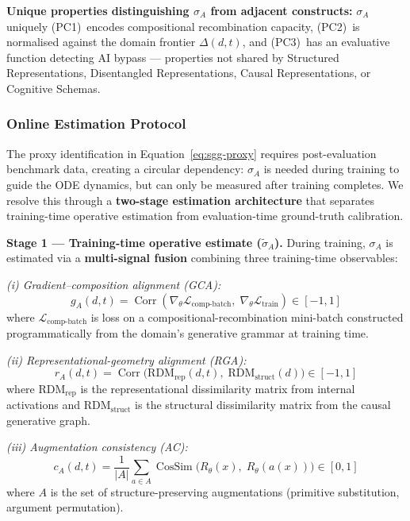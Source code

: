 \documentclass[11pt,a4paper]{article}
\DeclareMathOperator{\Corr}{Corr}
\DeclareMathOperator{\CosSim}{CosSim}
\begin{document}
\textbf{Unique properties distinguishing $\sigma_A$ from adjacent
constructs:} $\sigma_A$ uniquely (PC1)~encodes compositional
recombination capacity, (PC2)~is normalised against the domain frontier
$\Delta(d,t)$, and (PC3)~has an evaluative function detecting AI bypass
--- properties not shared by Structured Representations, Disentangled
Representations, Causal Representations, or Cognitive Schemas.

\subsubsection{Online Estimation Protocol}\label{sec:online-estimation}

The proxy identification in Equation~\eqref{eq:sgg-proxy} requires
post-evaluation benchmark data, creating a circular dependency: $\sigma_A$
is needed during training to guide the ODE dynamics, but can only be
measured after training completes. We resolve this through a \textbf{two-stage
estimation architecture} that separates training-time operative estimation
from evaluation-time ground-truth calibration.

\textbf{Stage 1 --- Training-time operative estimate ($\tilde{\sigma}_A$).}
During training, $\sigma_A$ is estimated via a \textbf{multi-signal fusion}
combining three training-time observables:

\textit{(i) Gradient--composition alignment (GCA):}
\begin{equation}\label{eq:gca}
g_A(d,t) = \Corr\!\left(\nabla_{\theta}\mathcal{L}_{\text{comp-batch}},\;\nabla_{\theta}\mathcal{L}_{\text{train}}\right) \in [-1,1]
\end{equation}
where $\mathcal{L}_{\text{comp-batch}}$ is loss on a compositional-recombination
mini-batch constructed programmatically from the domain's generative grammar
at training time.

\textit{(ii) Representational-geometry alignment (RGA):}
\begin{equation}\label{eq:rga}
r_A(d,t) = \Corr\!\Big(\text{RDM}_{\text{rep}}(d,t),\;\text{RDM}_{\text{struct}}(d)\Big) \in [-1,1]
\end{equation}
where $\text{RDM}_{\text{rep}}$ is the representational dissimilarity matrix
from internal activations and $\text{RDM}_{\text{struct}}$ is the structural
dissimilarity matrix from the causal generative graph.

\textit{(iii) Augmentation consistency (AC):}
\begin{equation}\label{eq:ac}
c_A(d,t) = \frac{1}{|A|}\sum_{a \in A} \CosSim\!\Big(R_{\theta}(x),\;R_{\theta}(a(x))\Big) \in [0,1]
\end{equation}
where $A$ is the set of structure-preserving augmentations (primitive
substitution, argument permutation).
\end{document}
